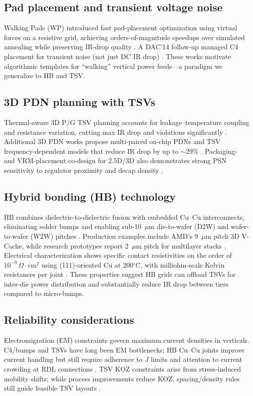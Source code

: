 \documentclass[conference]{IEEEtran}
\begin{document}
\subsection{Pad placement and transient voltage noise}
Walking Pads (WP) introduced fast pad-placement optimization using virtual forces on a resistive grid, achieving orders-of-magnitude speedups over simulated annealing while preserving IR-drop quality \cite{WangPatent}. A DAC’14 follow-up managed C4 placement for transient noise (not just DC IR drop) \cite{SkadronPage}. These works motivate algorithmic templates for “walking” vertical power feeds---a paradigm we generalize to HB and TSV.

\subsection{3D PDN planning with TSVs}
Thermal-aware 3D P/G TSV planning accounts for leakage–temperature coupling and resistance variation, cutting max IR drop and violations significantly \cite{LiASPDAC2012}. Additional 3D PDN works propose multi-paired on-chip PDNs and TSV frequency-dependent models that reduce IR drop by up to $\sim$29\% \cite{KimELEX2017}. Packaging- and VRM-placement co-design for 2.5D/3D also demonstrates strong PSN sensitivity to regulator proximity and decap density \cite{Bakir2020}. 

\subsection{Hybrid bonding (HB) technology}
HB combines dielectric-to-dielectric fusion with embedded Cu--Cu interconnects, eliminating solder bumps and enabling sub-10~$\mu$m die-to-wafer (D2W) and wafer-to-wafer (W2W) pitches \cite{SemiEngHB,EVGHB}. Production examples include AMD’s 9~$\mu$m pitch 3D V-Cache, while research prototypes report 2~$\mu$m pitch for multilayer stacks \cite{TomsHC33,SonyECTC2025}. Electrical characterization shows specific contact resistivities on the order of $10^{-9}\,\Omega\cdot\mathrm{cm}^2$ using (111)-oriented Cu at 200$^{\circ}$C, with milliohm-scale Kelvin resistances per joint \cite{HBContact2022}. These properties suggest HB grids can offload TSVs for inter-die power distribution and substantially reduce IR drop between tiers compared to micro-bumps. 

\subsection{Reliability considerations}
Electromigration (EM) constraints govern maximum current densities in verticals. C4/bumps and TSVs have long been EM bottlenecks; HB Cu--Cu joints improve current handling but still require adherence to $J$ limits and attention to current crowding at RDL connections \cite{TVLSIEMC4,EMCuCuPubMed}. TSV KOZ constraints arise from stress-induced mobility shifts; while process improvements reduce KOZ, spacing/density rules still guide feasible TSV layouts \cite{KOZPatent,GFNearZeroKOZ}.
\end{document}

